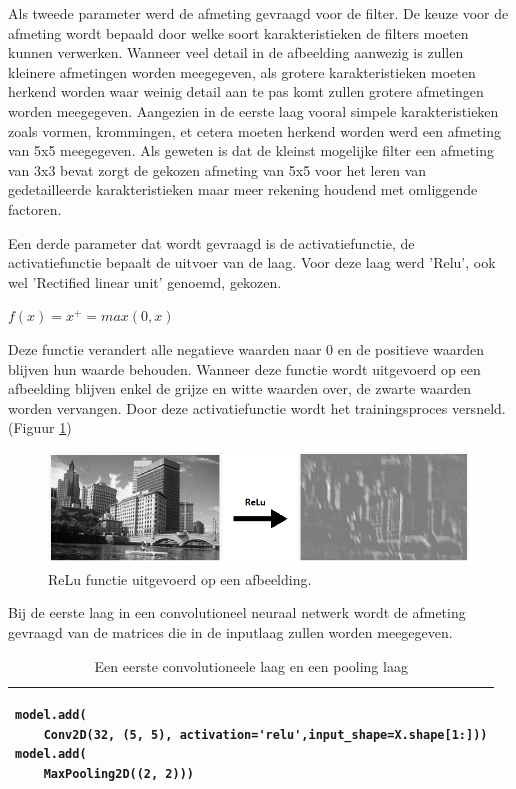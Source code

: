 Als tweede parameter werd de afmeting gevraagd voor de filter.
De keuze voor de afmeting wordt bepaald door welke soort karakteristieken de filters moeten kunnen verwerken. Wanneer veel detail in de afbeelding aanwezig is zullen kleinere afmetingen worden meegegeven, als grotere karakteristieken moeten herkend worden waar weinig detail aan te pas komt zullen grotere afmetingen worden meegegeven.
Aangezien in de eerste laag vooral simpele karakteristieken zoals vormen, krommingen, et cetera moeten herkend worden werd een afmeting van 5x5 meegegeven.
Als geweten is dat de kleinst mogelijke filter een afmeting van 3x3 bevat zorgt de gekozen afmeting van 5x5 voor het leren van gedetailleerde karakteristieken maar meer rekening houdend met omliggende factoren.

Een derde parameter dat wordt gevraagd is de activatiefunctie, de activatiefunctie bepaalt de uitvoer van de laag.
Voor deze laag werd 'Relu', ook wel 'Rectified linear unit' genoemd, gekozen.

        $f(x) = x^+ = max(0,x)$

Deze functie verandert alle negatieve waarden naar 0 en de positieve waarden blijven hun waarde behouden.
Wanneer deze functie wordt uitgevoerd op een afbeelding blijven enkel de grijze en witte waarden over, de zwarte waarden worden vervangen.
Door deze activatiefunctie wordt het trainingsproces versneld.
(Figuur \ref{tab:Relu})

\begin{figure}
    
    
    \includegraphics[width=\linewidth]{img/ReLu.png}
    
    \caption{ReLu functie uitgevoerd op een afbeelding.}
    \label{tab:Relu}
    
\end{figure}

Bij de eerste laag in een convolutioneel neuraal netwerk wordt de afmeting gevraagd van de matrices die in de inputlaag zullen worden meegegeven. 

\begin{table}[!htbp]
    \begin{tabular}{|l|}
        \hline
        \begin{lstlisting}
model.add(
    Conv2D(32, (5, 5), activation='relu',input_shape=X.shape[1:]))
model.add(
    MaxPooling2D((2, 2)))

        \end{lstlisting}
        \\ \hline
    \end{tabular}
    \caption{Een eerste convolutioneele laag en een pooling laag}\label{table:FirstLayers}
\end{table}

